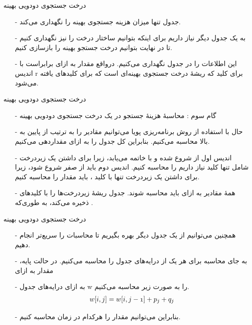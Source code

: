 \begin{frame}{‌درخت جستجوی دودویی بهینه}
\begin{itemize}\itemr
\item[-]
جدول
 تنها میزان هزینه جستجوی بهینه را نگهداری می‌کند.
\item[-]
 به یک جدول دیگر نیاز داریم برای اینکه بتوانیم ساختار درخت را نیز نگهداری کنیم تا در نهایت بتوانیم درخت جستجو بهینه را بازسازی کنیم.
\item[-]
این اطلاعات را در جدول
نگهداری می‌کنیم. درواقع مقدار
به ازای
برابراست با اندیس r برای کلید
که ریشهٔ درخت جستجوی بهینه‌ای است که برای کلیدهای
یافته می‌شود.
\end{itemize}
\end{frame}


\begin{frame}{‌درخت جستجوی دودویی بهینه}
\begin{itemize}\itemr
\item[-]
گام سوم : محاسبهٔ هزینهٔ جستجو در یک درخت جستجوی دودویی بهینه
\item[-]
حال با استفاده از روش برنامه‌ریزی پویا می‌توانیم مقادیر
را به ترتیب از پایین به بالا محاسبه می‌کنیم. بنابراین کل جدول را به ازای
مقداردهی می‌کنیم.
\item[-]
اندیس اول از 
 شروع شده و با
خاتمه می‌یابد، زیرا برای داشتن یک زیردرخت شامل تنها کلید
نیاز داریم
را محاسبه کنیم. اندیس دوم باید از صفر شروع شود، زیرا برای داشتن یک زیردرخت تنها با کلید
، باید مقدار
را محاسبه کنیم.
\item[-]
همهٔ مقادیر
به ازای
باید محاسبه شوند. جدول
ریشهٔ زیردرخت‌ها را با کلیدهای
ذخیره می‌کند، به طوری‌که
.
\end{itemize}
\end{frame}


\begin{frame}{‌درخت جستجوی دودویی بهینه}
\begin{itemize}\itemr
\item[-]
همچنین می‌توانیم از یک جدول دیگر بهره بگیریم تا محاسبات را سریع‌تر انجام دهیم.
\item[-]
به جای محاسبه
برای هر یک از درایه‌های
جدول
را محاسبه می‌کنیم. در حالت پایه، مقدار
به ازای
\item[-]
به ازای
درایه‌های جدول w را به صورت زیر محاسبه می‌کنیم.
\begin{align*}
\mathnormal{w[i,j] = w[i,j-1] + p_j + q_j}
\end{align*}
\item[-]
بنابراین می‌توانیم
مقدار
را هرکدام در زمان
محاسبه کنیم.
\end{itemize}
\end{frame}


